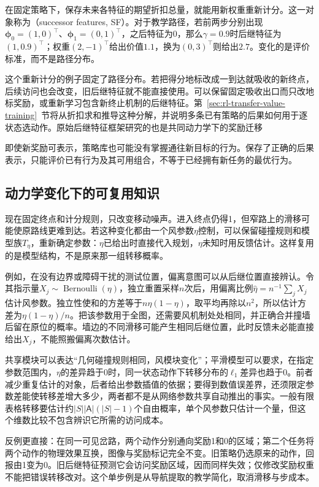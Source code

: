 在固定策略下，保存未来各特征的期望折扣总量，就能用新权重重新计分。这一对象称为（successor features, SF）。对于教学路径，若前两步分别出现$\bm\phi_0=(1,0)^\top$、$\bm\phi_1=(0,1)^\top$，之后特征为0，那么$\gamma=0.9$时后继特征为$(1,0.9)^\top$；权重$(2,-1)^\top$给出价值$1.1$，换为$(0,3)^\top$则给出$2.7$。变化的是评价标准，而不是路径分布。

这个重新计分的例子固定了路径分布。若把得分地标改成一到达就吸收的新终点，后续访问也会改变，旧后继特征就不能直接使用。可以保留固定吸收出口而只改地标奖励，或重新学习包含新终止机制的后继特征。第~\ref{sec:rl-transfer-value-training}~节将从折扣求和推导这种分解，并说明多条已有策略的后果如何用于逐状态选动作。原始后继特征框架研究的也是共同动力学下的奖励迁移

即使新奖励可表示，策略库也可能没有掌握通往新目标的行为。保存了正确的后果表示，只能评价已有行为及其可用组合，不等于已经拥有新任务的最优行为。

\subsection{动力学变化下的可复用知识}
\label{sec:rl-transfer-dynamics-change}

现在固定终点和计分规则，只改变移动噪声。进入终点仍得1，但窄路上的滑移可能使原路线更难到达。若这种变化都由一个风参数$\eta$控制，可以保留碰撞规则和模型族$T_\eta$，重新确定参数：$\eta$已给出时直接代入规划，$\eta$未知时用反馈估计。这样复用的是模型结构，不是原来那一组转移概率。

例如，在没有边界或障碍干扰的测试位置，偏离意图可以从后继位置直接辨认。令其指示量$X_j\sim\operatorname{Bernoulli}(\eta)$，独立重置采样$n$次后，用偏离比例$\widehat\eta=n^{-1}\sum_jX_j$估计风参数。独立性使和的方差等于$n\eta(1-\eta)$，取平均再除以$n^2$，所以估计方差为$\eta(1-\eta)/n$。把该参数用于全图，还需要风机制处处相同，并正确合并撞墙后留在原位的概率。墙边的不同滑移可能产生相同后继位置，此时反馈未必能直接给出$X_j$，不能照搬偏离次数估计。

共享模块可以表达“几何碰撞规则相同，风模块变化”；平滑模型可以要求，在指定参数范围内，$\eta$的差异趋于0时，同一状态动作下转移分布的$\ell_1$差异也趋于0。前者减少重复估计的对象，后者给出参数插值的依据；要得到数值误差界，还须限定参数差能使转移差增大多少，两者都不是从网络参数共享自动推出的事实。一般有限表格转移要估计约$|S||\mathsf A|(|S|-1)$个自由概率，单个风参数只估计一个量，但这个维数比较不包含辨识它所需的访问成本。

反例更直接：在同一可见岔路，两个动作分别通向奖励1和0的区域；第二个任务将两个动作的物理效果互换，图像与奖励标记完全不变。旧策略仍选原来的动作，回报由1变为0。旧后继特征预测它会访问奖励区域，因而同样失效；仅修改奖励权重不能把错误转移改对。这个单步例是从导航提取的教学简化，取消滑移与步成本。

